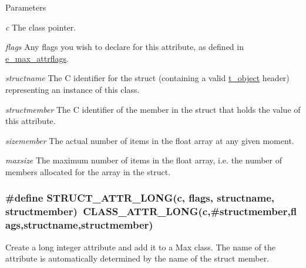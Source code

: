 \begin{DoxyParams}{Parameters}
\item[{\em c}]The class pointer. \item[{\em flags}]Any flags you wish to declare for this attribute, as defined in \hyperlink{group__attr_gaf296cfc6741bb19207f6ed8062809115}{e\_\-max\_\-attrflags}. \item[{\em structname}]The C identifier for the struct (containing a valid \hyperlink{structt__object}{t\_\-object} header) representing an instance of this class. \item[{\em structmember}]The C identifier of the member in the struct that holds the value of this attribute. \item[{\em sizemember}]The actual number of items in the float array at any given moment. \item[{\em maxsize}]The maximum number of items in the float array, i.e. the number of members allocated for the array in the struct. \end{DoxyParams}
\hypertarget{group__attr_ga7316b283e5b148d614773511dbd52ecc}{
\subsubsection[{STRUCT\_\-ATTR\_\-LONG}]{\setlength{\rightskip}{0pt plus 5cm}\#define STRUCT\_\-ATTR\_\-LONG(c, \/  flags, \/  structname, \/  structmember)~CLASS\_\-ATTR\_\-LONG(c,\#structmember,flags,structname,structmember)}}
\label{group__attr_ga7316b283e5b148d614773511dbd52ecc}


Create a long integer attribute and add it to a Max class. The name of the attribute is automatically determined by the name of the struct member.


